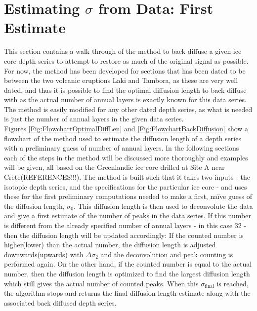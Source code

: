 \documentclass[../../CompleteThesis/Complete_1stDraft.tex]{subfiles}
\begin{document}
	
	\section[First $\sigma$ estimate]{Estimating $\sigma$ from Data: First Estimate}
	\label{Sec:Method_FirstSigmaEstimate}
	This section contains a walk through of the method to back diffuse a given ice core depth series to attempt to restore as much of the original signal as possible. For now, the method has been developed for sections that has been dated to be between the two volcanic eruptions Laki and Tambora, as these are very well dated, and thus it is possible to find the optimal diffusion length to back diffuse with as the actual number of annual layers is exactly known for this data series. The method is easily modified for any other dated depth series, as what is needed is just the number of annual layers in the given data series.\\
	Figures \ref{Fig:FlowchartOptimalDiffLen} and \ref{Fig:FlowchartBackDiffusion} show a flowchart of the method used to estimate the diffusion length of a depth series with a preliminary guess of number of annual layers. In the following sections each of the steps in the method will be discussed more thoroughly and examples will be given, all based on the Greenlandic ice core drilled at Site A near Crete(REFERENCES!!!).
	The method is built such that it takes two inputs - the isotopic depth series, and the specifications for the particular ice core - and uses these for the first preliminary computations needed to make a first, naïve guess of the diffusion length, $\sigma_0$.
	This diffusion length is then used to deconvolute the data and give a first estimate of the number of peaks in the data series. If this number is different from the already specified number of annual layers - in this case 32 - then the diffusion length will be updated accordingly: If the counted number is higher(lower) than the actual number, the diffusion length is adjusted downwards(upwards) with $\Delta\sigma_2$ and the deconvolution and peak counting is performed again.
	On the other hand, if the counted number is equal to the actual number, then the diffusion length is optimized to find the largest diffusion length which still gives the actual number of counted peaks. When this $\sigma_{\text{final}}$ is reached, the algorithm stops and returns the final diffusion length estimate along with the associated back diffused depth series.
\end{document}
